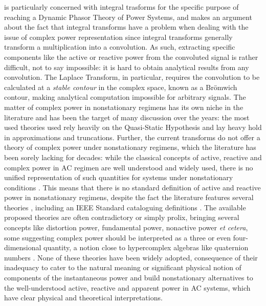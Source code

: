 	\cite{Mendes2020} is particularly concerned with integral trasforms for the specific purpose of reaching a Dynamic Phasor Theory of Power Systems, and makes an argument about the fact that integral transforms have a problem when dealing with the issue of complex power representation since integral transforms generally transform a multiplication into a convolution. As such, extracting specific components like the active or reactive power from the convoluted signal is rather difficult, not to say impossible: it is hard to obtain analytical results from any convolution. The Laplace Transform, in particular, requires the convolution to be calculated at a \textit{stable contour} in the complex space, known as a Brömwich contour, making analytical computation impossible for arbitrary signals. The matter of complex power in nonstationary regimens has its own niche in the literature and has been the target of many discussion over the years: the most used theories used rely heavily on the Quasi-Static Hypothesis and lay heavy hold in approximations and truncations. Further, the current transforms do not offer a theory of complex power under nonstationary regimens, which the literature has been sorely lacking for decades: while the classical concepts of active, reactive and complex power in AC regimen are well understood and widely used, there is no unified representation of such quantities for systems under nonstationary conditions . This means that there is no standard definition of active and reactive power in nonstationary regimens, despite the fact the literature features several theories , including an IEEE Standard cataloguing definitions . The available proposed theories are often contradictory or simply prolix, bringing several concepts like distortion power, fundamental power, nonactive power  \textit{et cetera}, some suggesting complex power should be interpreted as a three or even four-dimensional quantity, a notion close to hypercomplex algebras like quaternion numbers . None of these theories have been widely adopted, consequence of their inadequacy to cater to the natural meaning or significant physical notion of components of the instantaneous power  and build nonstationary alternatives to the well-understood active, reactive and apparent power in AC systems, which have clear physical and theoretical interpretations.

